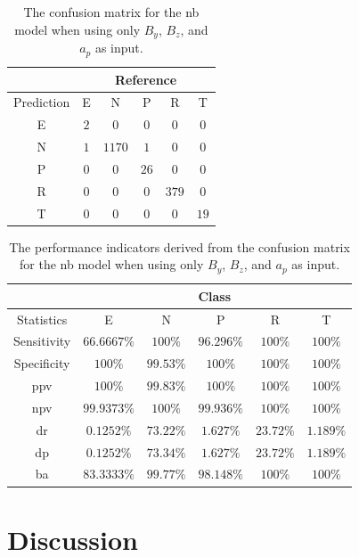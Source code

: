 \documentclass[sn-mathphys-num]{sn-jnl}%
\begin{document}
\begin{table}[!ht]
    \centering
    \caption{The confusion matrix for the \acrlong{nb} model when using only $B_{y}$, $B_{z}$, and $a_{p}$ as input.}
	\label{tab:cm:yzap:nb}
	\begin{tabular}{|c|c|c|c|c|c|}
		\hline
		 & \multicolumn{5}{|c|}{Reference} \\ \hline
		 Prediction & E & N & P & R & T \\ \hline
		 E & $2$ & $0$ & $0$ & $0$ & $0$ \\ \hline
		 N & $1$ & $1170$ & $1$ & $0$ & $0$ \\ \hline
		 P & $0$ & $0$ & $26$ & $0$ & $0$ \\ \hline
		 R & $0$ & $0$ & $0$ & $379$ & $0$ \\ \hline
		 T & $0$ & $0$ & $0$ & $0$ & $19$ \\ \hline
	\end{tabular}
\end{table}

\begin{table}[!ht]
    \centering
    \caption{The performance indicators derived from the confusion matrix for the \acrlong{nb} model when using only $B_{y}$, $B_{z}$, and $a_{p}$ as input.}
	\label{tab:cs:reverse:yzap:nb}
	\begin{tabular}{|c|c|c|c|c|c|}
		\hline
		 & \multicolumn{5}{c|}{Class} \\ \hline
		Statistics & E & N & P & R & T \\ \hline
		Sensitivity & $66.6667\%$ & $100\%$ & $96.296\%$ & $100\%$ & $100\%$ \\ \hline
		Specificity & $100\%$ & $99.53\%$ & $100\%$ & $100\%$ & $100\%$ \\ \hline
		\acrshort{ppv} & $100\%$ & $99.83\%$ & $100\%$ & $100\%$ & $100\%$ \\ \hline
		\acrshort{npv} & $99.9373\%$ & $100\%$ & $99.936\%$ & $100\%$ & $100\%$ \\ \hline
		\acrshort{dr} & $0.1252\%$ & $73.22\%$ & $1.627\%$ & $23.72\%$ & $1.189\%$ \\ \hline
		\acrshort{dp} & $0.1252\%$ & $73.34\%$ & $1.627\%$ & $23.72\%$ & $1.189\%$ \\ \hline
		\acrshort{ba} & $83.3333\%$ & $99.77\%$ & $98.148\%$ & $100\%$ & $100\%$ \\ \hline
	\end{tabular}
\end{table}

\section{Discussion}
\label{sec:Discussion}
\end{document}
